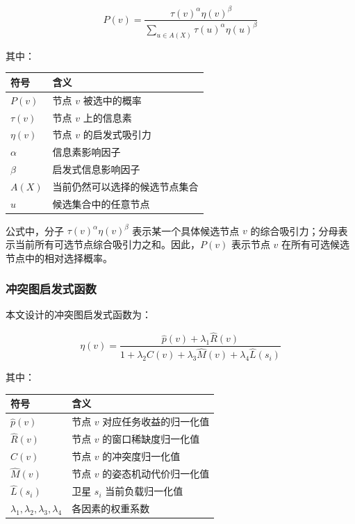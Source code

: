 \documentclass[UTF8,a4paper,12pt]{ctexart}
\begin{document}
\begin{equation}
P(v)=
\frac{\tau(v)^{\alpha}\eta(v)^{\beta}}
{\sum_{u\in A(X)}\tau(u)^{\alpha}\eta(u)^{\beta}}
\end{equation}

其中：

\begin{center}
\begin{tabular}{ll}
\toprule
符号 & 含义 \\
\midrule
$P(v)$ & 节点 $v$ 被选中的概率 \\
$\tau(v)$ & 节点 $v$ 上的信息素 \\
$\eta(v)$ & 节点 $v$ 的启发式吸引力 \\
$\alpha$ & 信息素影响因子 \\
$\beta$ & 启发式信息影响因子 \\
$A(X)$ & 当前仍然可以选择的候选节点集合 \\
$u$ & 候选集合中的任意节点 \\
\bottomrule
\end{tabular}
\end{center}

公式中，分子 $\tau(v)^\alpha\eta(v)^\beta$ 表示某一个具体候选节点 $v$ 的综合吸引力；分母表示当前所有可选节点综合吸引力之和。因此，$P(v)$ 表示节点 $v$ 在所有可选候选节点中的相对选择概率。

\subsubsection{冲突图启发式函数}

本文设计的冲突图启发式函数为：

\begin{equation}
\eta(v)=
\frac{\hat{p}(v)+\lambda_1\hat{R}(v)}
{1+\lambda_2\hat{C}(v)+\lambda_3\hat{M}(v)+\lambda_4\hat{L}(s_i)}
\end{equation}

其中：

\begin{center}
\begin{tabular}{ll}
\toprule
符号 & 含义 \\
\midrule
$\hat{p}(v)$ & 节点 $v$ 对应任务收益的归一化值 \\
$\hat{R}(v)$ & 节点 $v$ 的窗口稀缺度归一化值 \\
$\hat{C}(v)$ & 节点 $v$ 的冲突度归一化值 \\
$\hat{M}(v)$ & 节点 $v$ 的姿态机动代价归一化值 \\
$\hat{L}(s_i)$ & 卫星 $s_i$ 当前负载归一化值 \\
$\lambda_1,\lambda_2,\lambda_3,\lambda_4$ & 各因素的权重系数 \\
\bottomrule
\end{tabular}
\end{center}
\end{document}

